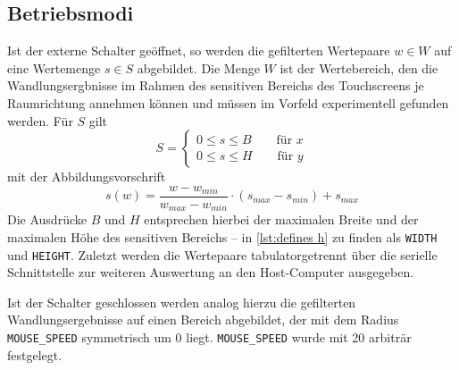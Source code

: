 		\subsection{Betriebsmodi}\label{sec:betriebsmodi}
			Ist der externe Schalter geöffnet, so werden die gefilterten Wertepaare \(w \in W\) auf eine Wertemenge \(s \in S\) abgebildet.
			Die Menge \(W\) ist der Wertebereich, den die Wandlungsergbnisse im Rahmen des sensitiven Bereichs des Touchscreens je Raumrichtung annehmen können und müssen im Vorfeld experimentell gefunden werden.
			Für \(S\) gilt
			\begin{equation}
				S=
				\begin{cases}
					0 \leq s \leq B \qquad \text{für } x\\
					0 \leq s \leq H \qquad \text{für } y
				\end{cases}
			\end{equation}
			mit der Abbildungsvorschrift
			\begin{equation}
				s(w) = \frac{w - w_{min}}{w_{max} - w_{min}} \cdot (s_{max} - s_{min}) + s_{max}
				\label{eq:mapping}
			\end{equation}
			Die Ausdrücke \(B\) und \(H\) entsprechen hierbei der maximalen Breite und der maximalen Höhe des sensitiven Bereichs -- in \cref{lst:defines h} zu finden als \texttt{WIDTH} und \texttt{HEIGHT}.
			Zuletzt werden die Wertepaare tabulatorgetrennt über die serielle Schnittstelle zur weiteren Auswertung an den Host-Computer ausgegeben.\par\medskip

			Ist der Schalter geschlossen werden analog hierzu die gefilterten Wandlungsergebnisse auf einen Bereich abgebildet, der mit dem Radius \texttt{MOUSE\_SPEED} symmetrisch um 0 liegt.
			\texttt{MOUSE\_SPEED} wurde mit 20 arbiträr festgelegt.